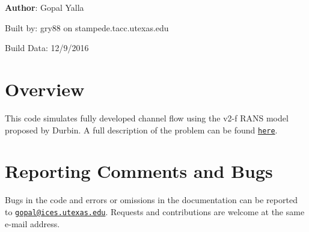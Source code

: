 {\bfseries Author}: Gopal Yalla

Built by: gry88 on stampede.tacc.utexas.edu

Build Data: 12/9/2016 

\hypertarget{index_Overview}{}\section{Overview}\label{index_Overview}
This code simulates fully developed channel flow using the v2-\/f RANS model proposed by Durbin. A full description of the problem can be found \href{http://users.ices.utexas.edu/~gopal/public/Problem_Statement.pdf}{\tt here}.\hypertarget{index_bugs}{}\section{Reporting Comments and Bugs}\label{index_bugs}
Bugs in the code and errors or omissions in the documentation can be reported to \href{mailto:gopal@ices.utexas.edu}{\tt gopal@ices.utexas.edu}. Requests and contributions are welcome at the same e-\/mail address. 